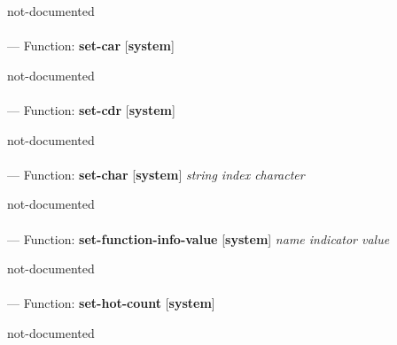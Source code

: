 \begin{adjustwidth}{5em}{5em}
not-documented
\end{adjustwidth}

\paragraph{}
\label{SYSTEM:SET-CAR}
--- Function: \textbf{set-car} [\textbf{system}] \textit{}

\begin{adjustwidth}{5em}{5em}
not-documented
\end{adjustwidth}

\paragraph{}
\label{SYSTEM:SET-CDR}
--- Function: \textbf{set-cdr} [\textbf{system}] \textit{}

\begin{adjustwidth}{5em}{5em}
not-documented
\end{adjustwidth}

\paragraph{}
\label{SYSTEM:SET-CHAR}
--- Function: \textbf{set-char} [\textbf{system}] \textit{string index character}

\begin{adjustwidth}{5em}{5em}
not-documented
\end{adjustwidth}

\paragraph{}
\label{SYSTEM:SET-FUNCTION-INFO-VALUE}
--- Function: \textbf{set-function-info-value} [\textbf{system}] \textit{name indicator value}

\begin{adjustwidth}{5em}{5em}
not-documented
\end{adjustwidth}

\paragraph{}
\label{SYSTEM:SET-HOT-COUNT}
--- Function: \textbf{set-hot-count} [\textbf{system}] \textit{}

\begin{adjustwidth}{5em}{5em}
not-documented
\end{adjustwidth}


